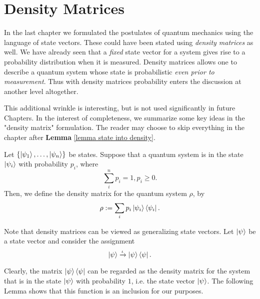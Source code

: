 
\chapter{Density Matrices} %

\label{Chapter4-density matrix} %

In the last chapter we formulated the postulates of quantum mechanics using the language of state vectors. These could have been stated using \textit{density matrices} as well. We have already seen that a {\emph{fixed}} state vector for a system gives rise to a probability distribution when it is measured.  Density matrices allows one to describe a quantum system whose state is probabilistic {\emph{even prior to measurement}}.  Thus with density matrices probability enters the discussion at another level altogether.

This additional wrinkle is interesting, but is not used significantly in future Chapters.  In the interest of completeness, we summarize some key ideas in the "density matrix" formulation.  The reader may choose to skip everything in the chapter after {\bf{Lemma}} \ref{lemma state into density}.

\begin{definition}
Let $\{\ket{\psi_1},\hdots,\ket{\psi_n}\}$ be states.  Suppose that a quantum system is in the state $\ket{\psi_i}$ with probability $p_i$, where  
\begin{equation}
\sum\limits_i^n p_i=1, p_i \geq 0.
\end{equation}
Then, we define the density matrix for the quantum system $\rho$, by 
\begin{equation}
    \rho:=\sum_i p_i \ket{\psi_i}\bra{\psi_i}.
\end{equation}
\end{definition}

Note that density matrices can be viewed as generalizing state vectors.  Let $\ket{\psi}$ be a state vector and consider the assignment
$$\ket{\psi} \xrightarrow{\iota} \ket{\psi}\bra{\psi}.$$

Clearly, the matrix $\ket{\psi}\bra{\psi}$ can be regarded as the density matrix for the system that is in the state $\ket{\psi}$ with probability $1$, i.e. the state vector $\ket{\psi}$.  The following Lemma shows that this function is an inclusion for our purposes.

